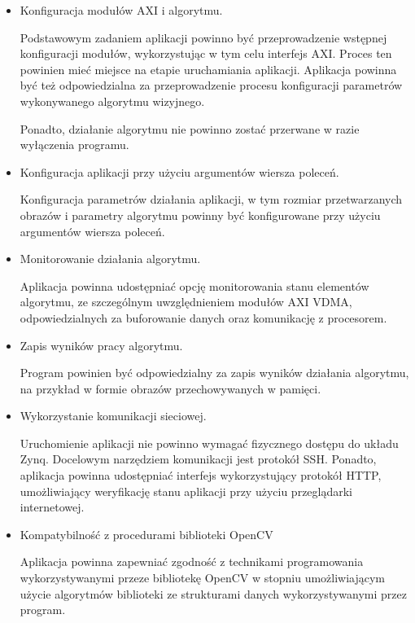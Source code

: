 \begin{itemize}

	\item Konfiguracja modułów AXI i algorytmu.
	
	Podstawowym zadaniem aplikacji powinno być przeprowadzenie wstępnej konfiguracji modułów, wykorzystując w tym celu interfejs AXI. Proces ten powinien mieć miejsce na etapie uruchamiania aplikacji. Aplikacja powinna być też odpowiedzialna za przeprowadzenie procesu konfiguracji parametrów wykonywanego algorytmu wizyjnego.
	
	Ponadto, działanie algorytmu nie powinno zostać przerwane w razie wyłączenia programu.
	
	\item Konfiguracja aplikacji przy użyciu argumentów wiersza poleceń.
	
	Konfiguracja parametrów działania aplikacji, w tym rozmiar przetwarzanych obrazów i parametry algorytmu powinny być konfigurowane przy użyciu argumentów wiersza poleceń.
	
	\item Monitorowanie działania algorytmu.
	
	Aplikacja powinna udostępniać opcję monitorowania stanu elementów algorytmu, ze szczególnym uwzględnieniem modułów AXI VDMA, odpowiedzialnych za buforowanie danych oraz komunikację z procesorem.
	
	\item Zapis wyników pracy algorytmu.
	
	Program powinien być odpowiedzialny za zapis wyników działania algorytmu, na przykład w formie obrazów przechowywanych w pamięci.
	
	\item Wykorzystanie komunikacji sieciowej.
	
	Uruchomienie aplikacji nie powinno wymagać fizycznego dostępu do układu Zynq. Docelowym narzędziem komunikacji jest protokół SSH. Ponadto, aplikacja powinna udostępniać interfejs wykorzystujący protokół HTTP, umożliwiający weryfikację stanu aplikacji przy użyciu przeglądarki internetowej.
	
	\item Kompatybilność z procedurami biblioteki OpenCV
	
	Aplikacja powinna zapewniać zgodność z technikami programowania wykorzystywanymi przeze bibliotekę OpenCV w stopniu umożliwiającym użycie algorytmów biblioteki ze strukturami danych wykorzystywanymi przez program.
\end{itemize}


